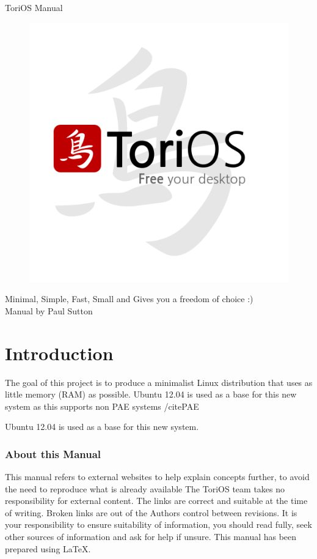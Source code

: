 \documentclass[12pt,a4paper]{book}
\author{Paul Sutton}
\begin{document}
\begin{center}
{\Huge ToriOS Manual}
\end{center}



\begin{figure}
\centering
\includegraphics[width=0.7\linewidth]{./FinalLogo}

\end{figure}


\begin{center}
Minimal, Simple, Fast, Small and Gives you a freedom of choice :) \\
Manual by Paul Sutton
\end{center}

\tableofcontents
{}
\chapter{Introduction}
The goal of this project is to produce a minimalist Linux distribution that uses as little memory (RAM) as possible. Ubuntu 12.04 is used as a base for this new system as this supports non PAE systems /cite{PAE}


Ubuntu 12.04 is used as a base for this new system.
\subsection{About this Manual}
This manual refers to external websites to help explain concepts further, to avoid the need to reproduce what is already available  The ToriOS team takes no responsibility for external content.  The links are correct and suitable at the time of writing.  Broken links are out of the Authors control between revisions.  It is your responsibility to ensure suitability of information, you should read fully, seek other sources of information and ask for help if unsure.  
This manual has been prepared using \LaTeX.
\end{document}
